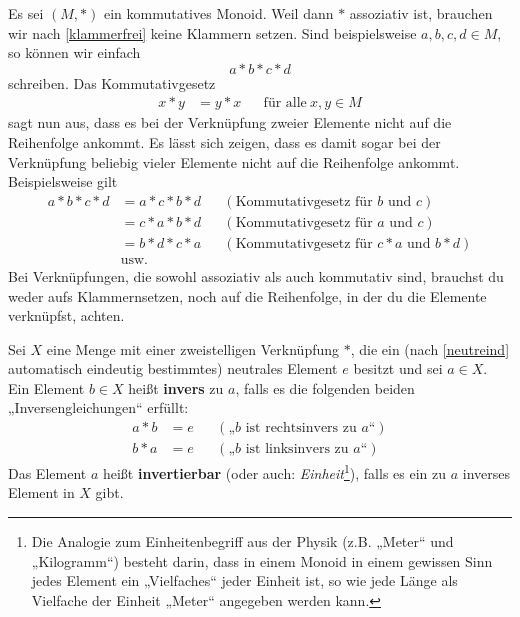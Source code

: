 \begin{bem} \label{reihenfolgeegal}
    Es sei $(M,*)$ ein kommutatives Monoid. Weil dann $*$ assoziativ ist, brauchen wir nach \cref{klammerfrei} keine Klammern setzen. Sind beispielsweise $a,b,c,d\in M$, so können wir einfach
        \[ a*b*c*d \]
    schreiben. Das Kommutativgesetz
    \begin{align*}
        x*y&=y*x && \text{für alle}\ x,y\in M
    \end{align*}
    sagt nun aus, dass es bei der Verknüpfung zweier Elemente nicht auf die Reihenfolge ankommt. Es lässt sich zeigen, dass es damit sogar bei der Verknüpfung beliebig vieler Elemente nicht auf die Reihenfolge ankommt. Beispielsweise gilt
    \begin{align*}
        a*b*c*d & = a*c*b*d && (\text{Kommutativgesetz für $b$ und $c$}) \\
        & = c*a*b*d && (\text{Kommutativgesetz für $a$ und $c$}) \\
        & = b*d*c*a && (\text{Kommutativgesetz für $c*a$ und $b*d$}) \\
        & \text{usw.}
    \end{align*}
    Bei Verknüpfungen, die sowohl assoziativ als auch kommutativ sind, brauchst du weder aufs Klammernsetzen, noch auf die Reihenfolge, in der du die Elemente verknüpfst, achten.
\end{bem}


\begin{defin} \label{def:inverse}  
    Sei $X$ eine Menge mit einer zweistelligen Verknüpfung $*$, die ein (nach \cref{neutreind} automatisch eindeutig bestimmtes) neutrales Element $e$ besitzt und sei $a\in X$. Ein Element $b\in X$ heißt \textbf{invers} zu $a$, falls es die folgenden beiden „Inversengleichungen“ erfüllt:
    \begin{align*}
        a*b & = e && (\text{„$b$ ist rechtsinvers zu $a$“}) \\
        b*a & = e && (\text{„$b$ ist linksinvers zu $a$“})
    \end{align*}
    Das Element $a$ heißt \textbf{invertierbar} (oder auch: \emph{Einheit}\footnote{Die Analogie zum Einheitenbegriff aus der Physik (z.B. „Meter“ und „Kilogramm“) besteht darin, dass in einem Monoid in einem gewissen Sinn jedes Element ein „Vielfaches“ jeder Einheit ist, so wie jede Länge als Vielfache der Einheit „Meter“ angegeben werden kann.}), falls es ein zu $a$ inverses Element in $X$ gibt.
\end{defin}


